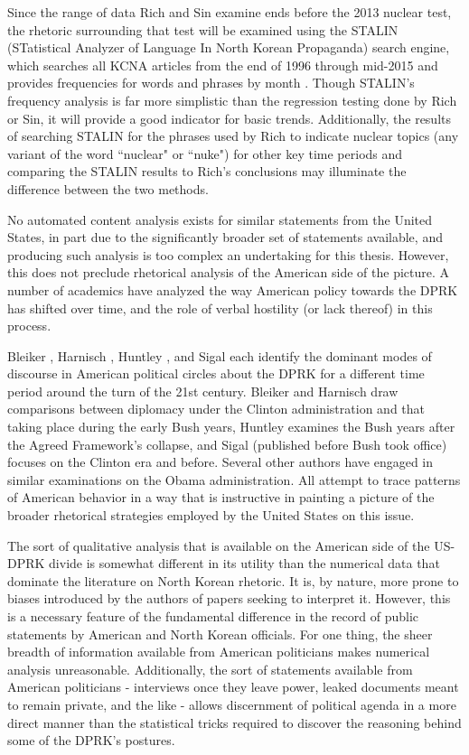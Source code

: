 \documentclass{article}
\begin{document}
Since the range of data Rich and Sin examine ends before the 2013 nuclear test, the rhetoric surrounding that test will be examined using the STALIN (STatistical Analyzer of Language In North Korean Propaganda) search engine, which searches all KCNA articles from the end of 1996 through mid-2015 and provides frequencies for words and phrases by month \cite{stalin}. Though STALIN's frequency analysis is far more simplistic than the regression testing done by Rich or Sin, it will provide a good indicator for basic trends. Additionally, the results of searching STALIN for the phrases used by Rich to indicate nuclear topics (any variant of the word ``nuclear" or ``nuke") for other key time periods and comparing the STALIN results to Rich's conclusions may illuminate the difference between the two methods.

No automated content analysis exists for similar statements from the United States, in part due to the significantly broader set of statements available, and producing such analysis is too complex an undertaking for this thesis. However, this does not preclude rhetorical analysis of the American side of the picture. A number of academics have analyzed the way American policy towards the DPRK has shifted over time, and the role of verbal hostility (or lack thereof) in this process.

Bleiker \cite{bleiker}, Harnisch \cite{harnisch}, Huntley \cite{huntley}, and Sigal \cite{sigal} each identify the dominant modes of discourse in American political circles about the DPRK for a different time period around the turn of the 21st century. Bleiker and Harnisch draw comparisons between diplomacy under the Clinton administration and that taking place during the early Bush years, Huntley examines the Bush years after the Agreed Framework's collapse, and Sigal (published before Bush took office) focuses on the Clinton era and before. Several other authors \cite{crs13,green} have engaged in similar examinations on the Obama administration. All attempt to trace patterns of American behavior in a way that is instructive in painting a picture of the broader rhetorical strategies employed by the United States on this issue.

The sort of qualitative analysis that is available on the American side of the US-DPRK divide is somewhat different in its utility than the numerical data that dominate the literature on North Korean rhetoric. It is, by nature, more prone to biases introduced by the authors of papers seeking to interpret it. However, this is a necessary feature of the fundamental difference in the record of public statements by American and North Korean officials. For one thing, the sheer breadth of information available from American politicians makes numerical analysis unreasonable. Additionally, the sort of statements available from American politicians - interviews once they leave power, leaked documents meant to remain private, and the like - allows discernment of political agenda in a more direct manner than the statistical tricks required to discover the reasoning behind some of the DPRK's postures. %
\end{document}
